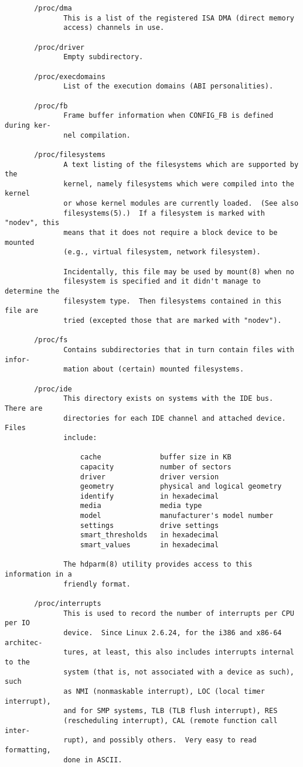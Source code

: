 \documentclass[]{article}
\begin{document}
\begin{verbatim}
       /proc/dma
              This is a list of the registered ISA DMA (direct memory
              access) channels in use.

       /proc/driver
              Empty subdirectory.

       /proc/execdomains
              List of the execution domains (ABI personalities).

       /proc/fb
              Frame buffer information when CONFIG_FB is defined during ker‐
              nel compilation.

       /proc/filesystems
              A text listing of the filesystems which are supported by the
              kernel, namely filesystems which were compiled into the kernel
              or whose kernel modules are currently loaded.  (See also
              filesystems(5).)  If a filesystem is marked with "nodev", this
              means that it does not require a block device to be mounted
              (e.g., virtual filesystem, network filesystem).

              Incidentally, this file may be used by mount(8) when no
              filesystem is specified and it didn't manage to determine the
              filesystem type.  Then filesystems contained in this file are
              tried (excepted those that are marked with "nodev").

       /proc/fs
              Contains subdirectories that in turn contain files with infor‐
              mation about (certain) mounted filesystems.

       /proc/ide
              This directory exists on systems with the IDE bus.  There are
              directories for each IDE channel and attached device.  Files
              include:

                  cache              buffer size in KB
                  capacity           number of sectors
                  driver             driver version
                  geometry           physical and logical geometry
                  identify           in hexadecimal
                  media              media type
                  model              manufacturer's model number
                  settings           drive settings
                  smart_thresholds   in hexadecimal
                  smart_values       in hexadecimal

              The hdparm(8) utility provides access to this information in a
              friendly format.

       /proc/interrupts
              This is used to record the number of interrupts per CPU per IO
              device.  Since Linux 2.6.24, for the i386 and x86-64 architec‐
              tures, at least, this also includes interrupts internal to the
              system (that is, not associated with a device as such), such
              as NMI (nonmaskable interrupt), LOC (local timer interrupt),
              and for SMP systems, TLB (TLB flush interrupt), RES
              (rescheduling interrupt), CAL (remote function call inter‐
              rupt), and possibly others.  Very easy to read formatting,
              done in ASCII.


\end{verbatim}
\end{document}
